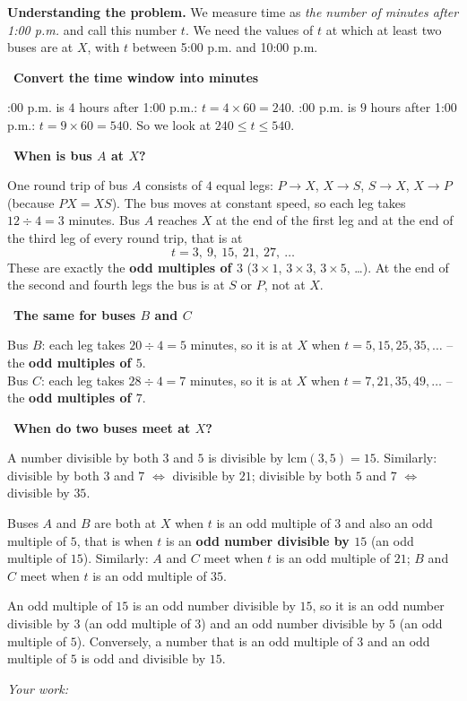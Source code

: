 \documentclass[11pt]{article}
\newif\ifsol \solfalse
\newcommand{\probsol}[1]{%
  \begin{lrbox}{\solmeasure}\begin{minipage}{\dimexpr\linewidth-24pt\relax}#1\end{minipage}\end{lrbox}%
  \ifsol
    \begin{solbox}#1\end{solbox}%
  \else
    \setlength{\solht}{\dimexpr\ht\solmeasure+\dp\solmeasure+0.85cm\relax}%
    \ifdim\solht<1.35cm\setlength{\solht}{1.35cm}\fi
    \ifdim\solht>\StudentMaxWork\setlength{\solht}{\StudentMaxWork}\fi
    \begin{tcolorbox}[colback=white,colframe=Line,boxrule=0.8pt,arc=5pt,
      left=8pt,right=8pt,top=4pt,bottom=4pt,height=\solht]{\footnotesize\color{Slate}\itshape\WorkWord}\end{tcolorbox}%
  \fi}
\newlength{\StudentMaxWork}\setlength{\StudentMaxWork}{7.5cm}
\newcommand{\step}[2]{\par\smallskip\noindent{\bfseries\color{tmBlue!85!black}\StepWord~#1.}\ {\bfseries #2}\par\nopagebreak}
\def\WorkWord{Your work:}
\def\StepWord{Step}
\begin{document}
\probsol{
\textbf{Understanding the problem.} We measure time as \emph{the number of minutes after 1:00 p.m.} and call this number $t$.
We need the values of $t$ at which at least two buses are at $X$, with $t$ between 5:00 p.m. and 10:00 p.m.

\step{1}{Convert the time window into minutes}
5:00 p.m. is $4$ hours after 1:00 p.m.: $t=4\times60=240$. \quad 10:00 p.m. is $9$ hours after 1:00 p.m.: $t=9\times60=540$.
So we look at $240\le t\le540$.

\step{2}{When is bus $A$ at $X$?}
One round trip of bus $A$ consists of $4$ equal legs: $P\to X$, $X\to S$, $S\to X$, $X\to P$ (because $PX=XS$).
The bus moves at constant speed, so each leg takes $12\div4=3$ minutes. Bus $A$ reaches $X$ at the end of the first leg and at the end
of the third leg of every round trip, that is at
\[t=3,\ 9,\ 15,\ 21,\ 27,\ \dots\]
These are exactly the \textbf{odd multiples of $3$} ($3\times1$, $3\times3$, $3\times5$, \dots). At the end of the second and fourth legs
the bus is at $S$ or $P$, not at $X$.

\step{3}{The same for buses $B$ and $C$}
Bus $B$: each leg takes $20\div4=5$ minutes, so it is at $X$ when $t=5,15,25,35,\dots$ -- the \textbf{odd multiples of $5$}.\\
Bus $C$: each leg takes $28\div4=7$ minutes, so it is at $X$ when $t=7,21,35,49,\dots$ -- the \textbf{odd multiples of $7$}.

\step{4}{When do two buses meet at $X$?}
\begin{recallbox}A number divisible by both $3$ and $5$ is divisible by $\text{lcm}(3,5)=15$. Similarly:
divisible by both $3$ and $7$ $\Leftrightarrow$ divisible by $21$; divisible by both $5$ and $7$ $\Leftrightarrow$
divisible by $35$.\end{recallbox}
Buses $A$ and $B$ are both at $X$ when $t$ is an odd multiple of $3$ and also an odd multiple of $5$, that is when $t$ is an
\textbf{odd number divisible by $15$} (an odd multiple of $15$). Similarly: $A$ and $C$ meet when $t$ is an odd multiple of $21$;
$B$ and $C$ meet when $t$ is an odd multiple of $35$.
\begin{proofbox}An odd multiple of $15$ is an odd number divisible by $15$, so it is an odd number divisible by $3$ (an odd multiple of $3$)
and an odd number divisible by $5$ (an odd multiple of $5$). Conversely, a number that is an odd multiple of $3$ and an odd multiple of $5$ is
odd and divisible by $15$.\end{proofbox}

}
\end{document}
